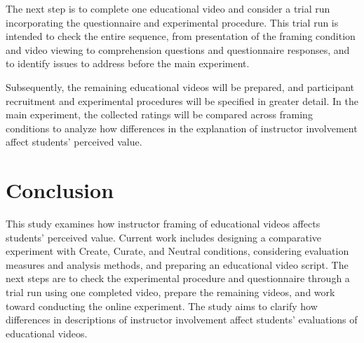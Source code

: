 \documentclass[11pt]{ltjarticle}
\begin{document}
The next step is to complete one educational video and consider a trial run incorporating the questionnaire and experimental procedure. This trial run is intended to check the entire sequence, from presentation of the framing condition and video viewing to comprehension questions and questionnaire responses, and to identify issues to address before the main experiment.

Subsequently, the remaining educational videos will be prepared, and participant recruitment and experimental procedures will be specified in greater detail. In the main experiment, the collected ratings will be compared across framing conditions to analyze how differences in the explanation of instructor involvement affect students' perceived value.

\section{Conclusion}

This study examines how instructor framing of educational videos affects students' perceived value. Current work includes designing a comparative experiment with Create, Curate, and Neutral conditions, considering evaluation measures and analysis methods, and preparing an educational video script. The next steps are to check the experimental procedure and questionnaire through a trial run using one completed video, prepare the remaining videos, and work toward conducting the online experiment. The study aims to clarify how differences in descriptions of instructor involvement affect students' evaluations of educational videos.
\end{document}
